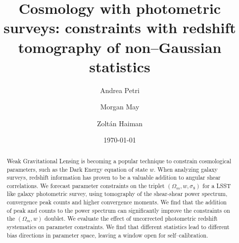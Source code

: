 \documentclass[reprint,aps,prd,superscriptaddress,showkeys,showpacs]{revtex4-1}
\begin{document}
\title{Cosmology with photometric surveys: constraints with redshift tomography of non--Gaussian statistics}

\author{Andrea Petri}

\author{Morgan May}

\author{Zolt\'an Haiman}

\date{\today}

\label{firstpage}

\begin{abstract}
Weak Gravitational Lensing is becoming a popular technique to constrain cosmological parameters, such as the Dark Energy equation of state $w$. When analyzing galaxy surveys, redshift information has proven to be a valuable addition to angular shear correlations. We forecast parameter constraints on the triplet $(\Omega_m,w,\sigma_8)$ for a LSST like galaxy photometric survey, using tomography of the shear-shear power spectrum, convergence peak counts and higher convergence moments. We find that the addition of peak and counts to the power spectrum can significantly improve the constraints on the $(\Omega_m,w)$ doublet. We evaluate the effect of uncorrected photometric redshift systematics on parameter constraints. We find that different statistics lead to different bias directions in parameter space, leaving a window open for self--calibration. 
\end{abstract}



\maketitle


\end{document}
